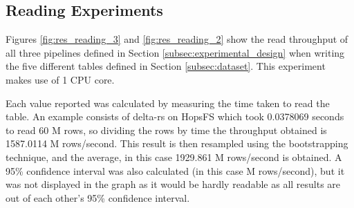 \subsection{Reading Experiments}

Figures \ref{fig:res_reading_3} and \ref{fig:res_reading_2} show the read throughput of all three pipelines defined in Section \ref{subsec:experimental_design} when writing the five different tables defined in Section \ref{subsec:dataset}. This experiment makes use of 1 \gls{CPU} core. 

Each value reported was calculated by measuring the time taken to read the table. An example consists of delta-rs on \gls{HopsFS} which took 0.0378069 seconds to read 60 M rows, so dividing the rows by time the throughput obtained is 1587.0114 M rows/second. This result is then resampled using the bootstrapping technique, and the average, in this case 1929.861 M rows/second is obtained. A 95\% confidence interval was also calculated (in this case  M rows/second), but it was not displayed in the graph as it would be hardly readable as all results are out of each other's 95\% confidence interval.

